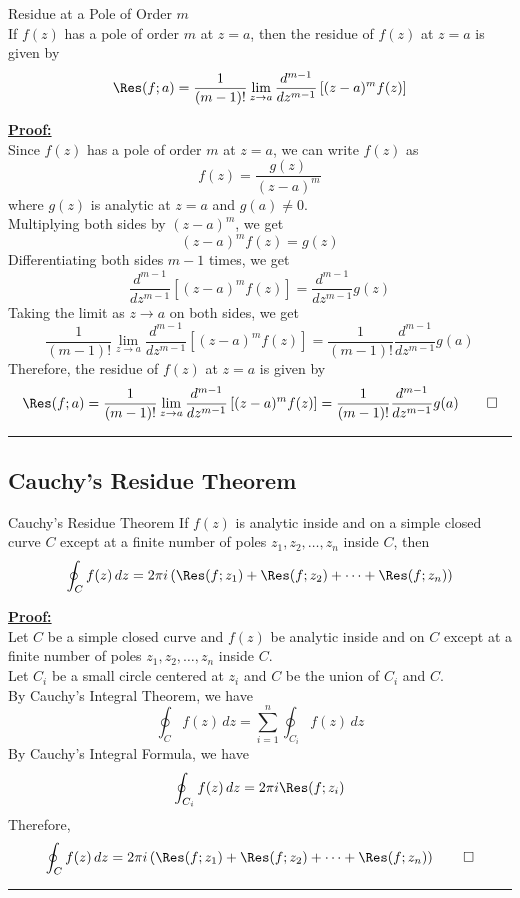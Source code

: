 \begin{theorem}{Residue at a Pole of Order $m$}{}
    \\If $f(z)$ has a pole of order $m$ at $z=a$, then the residue of $f(z)$ at $z=a$ is given by
    \[ \Res(f;a) = \frac{1}{(m-1)!} \lim_{z \to a} \frac{d^{m-1}}{dz^{m-1}} \left[ (z-a)^m f(z) \right] \]
\end{theorem}

\underline{\textbf{Proof:}} \\
Since $f(z)$ has a pole of order $m$ at $z=a$, we can write $f(z)$ as
\[ f(z) = \frac{g(z)}{(z-a)^m} \]
where $g(z)$ is analytic at $z=a$ and $g(a) \neq 0$. \\
Multiplying both sides by $(z-a)^m$, we get
\[ (z-a)^m f(z) = g(z) \]
Differentiating both sides $m-1$ times, we get
\[ \frac{d^{m-1}}{dz^{m-1}} \left[ (z-a)^m f(z) \right] = \frac{d^{m-1}}{dz^{m-1}} g(z) \]
Taking the limit as $z \to a$ on both sides, we get
\[ \frac{1}{(m-1)!} \lim_{z \to a} \frac{d^{m-1}}{dz^{m-1}} \left[ (z-a)^m f(z) \right] = \frac{1}{(m-1)!} \frac{d^{m-1}}{dz^{m-1}} g(a) \]
Therefore, the residue of $f(z)$ at $z=a$ is given by
\[ \Res(f;a) = \frac{1}{(m-1)!} \lim_{z \to a} \frac{d^{m-1}}{dz^{m-1}} \left[ (z-a)^m f(z) \right] = \frac{1}{(m-1)!} \frac{d^{m-1}}{dz^{m-1}} g(a) \qed \]

\vspace{20pt}\rule{3in}{1pt}

\subsection{Cauchy's Residue Theorem}
\begin{theorem}{Cauchy's Residue Theorem}{}
    If $f(z)$ is analytic inside and on a simple closed curve $C$ except at a finite number of poles $z_1, z_2, \ldots, z_n$ inside $C$, then
    \[ \oint_C f(z) \, dz = 2\pi i \left( \Res(f;z_1) + \Res(f;z_2) + \cdots + \Res(f;z_n) \right) \]
\end{theorem}

\underline{\textbf{Proof:}} \\
Let $C$ be a simple closed curve and $f(z)$ be analytic inside and on $C$ except at a finite number of poles $z_1, z_2, \ldots, z_n$ inside $C$. \\
Let $C_i$ be a small circle centered at $z_i$ and $C$ be the union of $C_i$ and $C$. \\
By Cauchy's Integral Theorem, we have
\[ \oint_C f(z) \, dz = \sum_{i=1}^{n} \oint_{C_i} f(z) \, dz \]
By Cauchy's Integral Formula, we have
\[ \oint_{C_i} f(z) \, dz = 2\pi i \Res(f;z_i) \]
Therefore,
\[ \oint_C f(z) \, dz = 2\pi i \left( \Res(f;z_1) + \Res(f;z_2) + \cdots + \Res(f;z_n) \right) \qed \]

\vspace{20pt}\rule{3in}{1pt}
